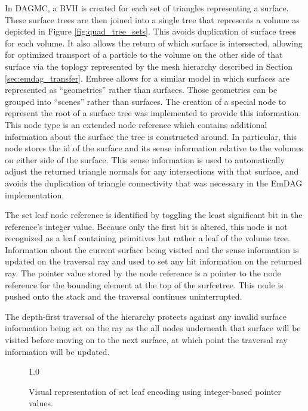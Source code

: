 In DAGMC, a BVH is created for each set of triangles representing a
surface. These surface trees are then joined into a single tree that represents
a volume as depicted in Figure \ref{fig:quad_tree_sets}. This avoids duplication
of surface trees for each volume. It also allows the return of which surface is
intersected, allowing for optimized transport of a particle to the volume on the
other side of that surface via the toplogy represented by the mesh hierarchy
described in Section \ref{sec:emdag_transfer}. Embree allows for a similar model
in which surfaces are represented as ``geometries'' rather than surfaces. Those
geometries can be grouped into ``scenes'' rather than surfaces.  The creation of
a special node to represent the root of a surface tree was implemented to
provide this information. This node type is an extended node reference which
contains additional information about the surface the tree is constructed
around. In particular, this node stores the id of the surface and its sense
information relative to the volumes on either side of the surface. This sense
information is used to automatically adjust the returned triangle normals for
any intersections with that surface, and avoids the duplication of triangle
connectivity that was necessary in the EmDAG implementation.

The set leaf node reference is identified by toggling the least significant bit in
the reference's integer value. Because only the first bit is altered, this node
is not recognized as a leaf containing primitives but rather a leaf of the
volume tree. Information about the current surface being visited and the sense
information is updated on the traversal ray and used to set any hit information
on the returned ray. The pointer value stored by the node reference is a pointer
to the node reference for the bounding element at the top of the
surfcetree. This node is pushed onto the stack and the traversal continues
uninterrupted.

The depth-first traversal of the hierarchy protects against
any invalid surface information being set on the ray as the all nodes underneath
that surface will be visited before moving on to the next surface, at which
point the traversal ray information will be updated.

\begin{figure}
  {1.0\textwidth}
  \caption{Visual representation of set leaf encoding using integer-based
    pointer values.}
  \label{fig:set_leaf_encoding}
\end{figure}

